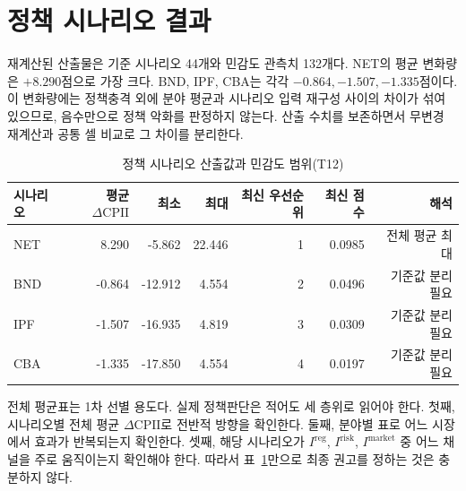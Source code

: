 \documentclass[11pt,a4paper]{report}
\begin{document}
\section{정책 시나리오 결과}
재계산된 산출물은 기준 시나리오 44개와 민감도 관측치 132개다. NET의 평균 변화량은 \(+8.290\)점으로 가장 크다. BND, IPF, CBA는 각각 \(-0.864,-1.507,-1.335\)점이다. 이 변화량에는 정책충격 외에 분야 평균과 시나리오 입력 재구성 사이의 차이가 섞여 있으므로, 음수만으로 정책 악화를 판정하지 않는다. 산출 수치를 보존하면서 무변경 재계산과 공통 셀 비교로 그 차이를 분리한다.

\begin{table}[H]
\centering
\small
\caption{정책 시나리오 산출값과 민감도 범위(T12)}
\label{tab:results_policy_scenarios}
\begin{tabular}{lrrrrrr}
\toprule
\rowcolor{ReportTableHead}
시나리오 & 평균 $\Delta \mathrm{CPII}$ & 최소 & 최대 & 최신 우선순위 & 최신 점수 & 해석 \\
\midrule
NET & 8.290 & -5.862 & 22.446 & 1 & 0.0985 & 전체 평균 최대 \\
BND & -0.864 & -12.912 & 4.554 & 2 & 0.0496 & 기준값 분리 필요 \\
IPF & -1.507 & -16.935 & 4.819 & 3 & 0.0309 & 기준값 분리 필요 \\
CBA & -1.335 & -17.850 & 4.554 & 4 & 0.0197 & 기준값 분리 필요 \\
\bottomrule
\end{tabular}
\end{table}

전체 평균표는 1차 선별 용도다. 실제 정책판단은 적어도 세 층위로 읽어야 한다. 첫째, 시나리오별 전체 평균 $\Delta \mathrm{CPII}$로 전반적 방향을 확인한다. 둘째, 분야별 표로 어느 시장에서 효과가 반복되는지 확인한다. 셋째, 해당 시나리오가 $I^{\mathrm{reg}}$, $I^{\mathrm{risk}}$, $I^{\mathrm{market}}$ 중 어느 채널을 주로 움직이는지 확인해야 한다. 따라서 표~\ref{tab:results_policy_scenarios}만으로 최종 권고를 정하는 것은 충분하지 않다.
\end{document}
